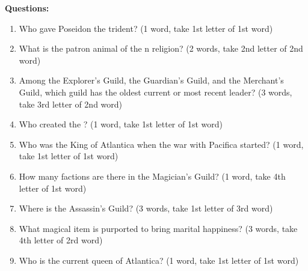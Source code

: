 \documentclass[green]{NeptuneBall}
\begin{document}
{\bf Questions:}
\begin{enumerate}
 \item Who gave Poseidon the trident? (1 word, take 1st letter of 1st word) \vspace{3 mm}\\  \underline{\hspace{15cm}}
 \item What is the patron animal of the \pAtlantis{}n religion? (2 words, take 2nd letter of 2nd word) \vspace{3 mm}\\ \underline{\hspace{15cm}}
	\item Among the Explorer's Guild, the Guardian's Guild, and the Merchant's Guild, which guild has the oldest current or most recent leader? (3 words, take 3rd letter of 2nd word) \vspace{3 mm}\\ \underline{\hspace{15cm}}
	\item Who created the \sArtifactTwo{}? (1 word, take 1st letter of 1st word) \vspace{3 mm}\\ \underline{\hspace{15cm}}
	\item Who was the King of Atlantica when the war with Pacifica started? (1 word, take 1st letter of 1st word) \vspace{3 mm}\\ \underline{\hspace{15cm}}
	\item How many factions are there in the Magician's Guild? (1 word, take 4th letter of 1st word) \vspace{3 mm}\\ \underline{\hspace{15cm}}
	\item Where is the Assassin's Guild? (3 words, take 1st letter of 3rd word) \vspace{3 mm}\\ \underline{\hspace{15cm}}
	\item What magical item is purported to bring marital happiness? (3 words, take 4th letter of 2rd word) \vspace{3 mm}\\ \underline{\hspace{15cm}}
	\item Who is the current queen of Atlantica? (1 word, take 1st letter of 1st word) \vspace{3 mm}\\ \underline{\hspace{15cm}} %

\end{enumerate}
\end{document}
